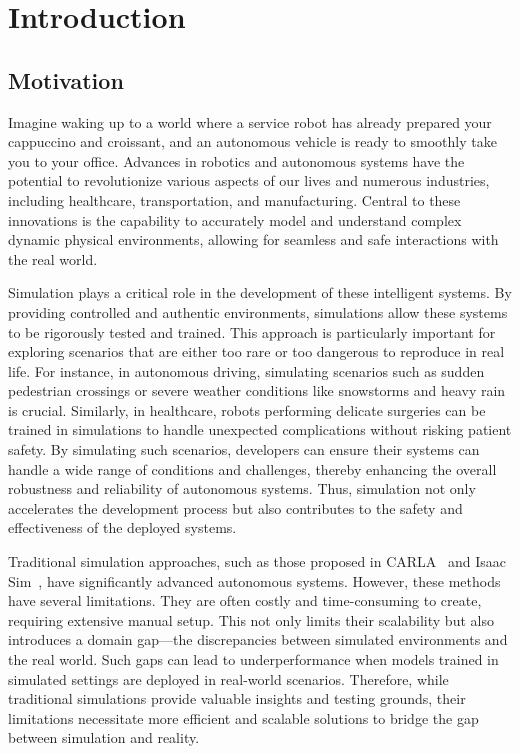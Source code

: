 \chapter{Introduction}

\section{Motivation}

Imagine waking up to a world where a service robot has already prepared your cappuccino and croissant, and an autonomous vehicle is ready to smoothly take you to your office. Advances in robotics and autonomous systems have the potential to revolutionize various aspects of our lives and numerous industries, including healthcare, transportation, and manufacturing. Central to these innovations is the capability to accurately model and understand complex dynamic physical environments, allowing for seamless and safe interactions with the real world.

Simulation plays a critical role in the development of these intelligent systems. By providing controlled and authentic environments, simulations allow these systems to be rigorously tested and trained. This approach is particularly important for exploring scenarios that are either too rare or too dangerous to reproduce in real life. For instance, in autonomous driving, simulating scenarios such as sudden pedestrian crossings or severe weather conditions like snowstorms and heavy rain is crucial. Similarly, in healthcare, robots performing delicate surgeries can be trained in simulations to handle unexpected complications without risking patient safety. By simulating such scenarios, developers can ensure their systems can handle a wide range of conditions and challenges, thereby enhancing the overall robustness and reliability of autonomous systems. Thus, simulation not only accelerates the development process but also contributes to the safety and effectiveness of the deployed systems.

Traditional simulation approaches, such as those proposed in CARLA~\cite{dosovitskiy2017carla} and Isaac Sim~\cite{makoviychuk2021isaac}, have significantly advanced autonomous systems. However, these methods have several limitations. They are often costly and time-consuming to create, requiring extensive manual setup. This not only limits their scalability but also introduces a domain gap—the discrepancies between simulated environments and the real world. Such gaps can lead to underperformance when models trained in simulated settings are deployed in real-world scenarios. Therefore, while traditional simulations provide valuable insights and testing grounds, their limitations necessitate more efficient and scalable solutions to bridge the gap between simulation and reality.

